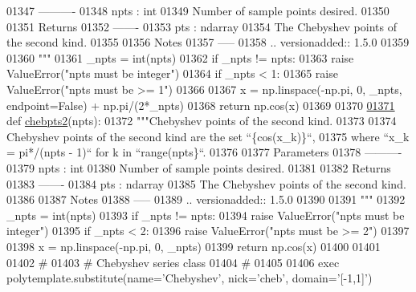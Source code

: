 \begin{DoxyCode}
01347 \textcolor{stringliteral}{    ----------}
01348 \textcolor{stringliteral}{    npts : int}
01349 \textcolor{stringliteral}{        Number of sample points desired.}
01350 \textcolor{stringliteral}{}
01351 \textcolor{stringliteral}{    Returns}
01352 \textcolor{stringliteral}{    -------}
01353 \textcolor{stringliteral}{    pts : ndarray}
01354 \textcolor{stringliteral}{        The Chebyshev points of the second kind.}
01355 \textcolor{stringliteral}{}
01356 \textcolor{stringliteral}{    Notes}
01357 \textcolor{stringliteral}{    -----}
01358 \textcolor{stringliteral}{    .. versionadded:: 1.5.0}
01359 \textcolor{stringliteral}{}
01360 \textcolor{stringliteral}{    """}
01361     \_npts = int(npts)
01362     \textcolor{keywordflow}{if} \_npts != npts:
01363         \textcolor{keywordflow}{raise} ValueError(\textcolor{stringliteral}{"npts must be integer"})
01364     \textcolor{keywordflow}{if} \_npts < 1:
01365         \textcolor{keywordflow}{raise} ValueError(\textcolor{stringliteral}{"npts must be >= 1"})
01366 
01367     x = np.linspace(-np.pi, 0, \_npts, endpoint=\textcolor{keyword}{False}) + np.pi/(2*\_npts)
01368     \textcolor{keywordflow}{return} np.cos(x)
01369 
01370 
\hypertarget{chebyshev_8py_source_l01371}{}\hyperlink{namespacepyneb_1_1utils_1_1chebyshev_a224bc370de0cfa204c3ac15d626d13e3}{01371} \textcolor{keyword}{def }\hyperlink{namespacepyneb_1_1utils_1_1chebyshev_a224bc370de0cfa204c3ac15d626d13e3}{chebpts2}(npts):
01372     \textcolor{stringliteral}{"""Chebyshev points of the second kind.}
01373 \textcolor{stringliteral}{}
01374 \textcolor{stringliteral}{    Chebyshev points of the second kind are the set ``\{cos(x\_k)\}``,}
01375 \textcolor{stringliteral}{    where ``x\_k = pi*/(npts - 1)`` for k in ``range(npts\}``.}
01376 \textcolor{stringliteral}{}
01377 \textcolor{stringliteral}{    Parameters}
01378 \textcolor{stringliteral}{    ----------}
01379 \textcolor{stringliteral}{    npts : int}
01380 \textcolor{stringliteral}{        Number of sample points desired.}
01381 \textcolor{stringliteral}{}
01382 \textcolor{stringliteral}{    Returns}
01383 \textcolor{stringliteral}{    -------}
01384 \textcolor{stringliteral}{    pts : ndarray}
01385 \textcolor{stringliteral}{        The Chebyshev points of the second kind.}
01386 \textcolor{stringliteral}{}
01387 \textcolor{stringliteral}{    Notes}
01388 \textcolor{stringliteral}{    -----}
01389 \textcolor{stringliteral}{    .. versionadded:: 1.5.0}
01390 \textcolor{stringliteral}{}
01391 \textcolor{stringliteral}{    """}
01392     \_npts = int(npts)
01393     \textcolor{keywordflow}{if} \_npts != npts:
01394         \textcolor{keywordflow}{raise} ValueError(\textcolor{stringliteral}{"npts must be integer"})
01395     \textcolor{keywordflow}{if} \_npts < 2:
01396         \textcolor{keywordflow}{raise} ValueError(\textcolor{stringliteral}{"npts must be >= 2"})
01397 
01398     x = np.linspace(-np.pi, 0, \_npts)
01399     \textcolor{keywordflow}{return} np.cos(x)
01400 
01401 
01402 \textcolor{comment}{#}
01403 \textcolor{comment}{# Chebyshev series class}
01404 \textcolor{comment}{#}
01405 
01406 exec polytemplate.substitute(name=\textcolor{stringliteral}{'Chebyshev'}, nick=\textcolor{stringliteral}{'cheb'}, domain=\textcolor{stringliteral}{'[-1,1]'})
\end{DoxyCode}

